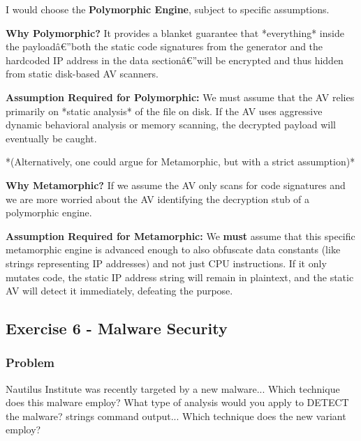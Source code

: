 \documentclass{article}
\begin{document}
I would choose the \textbf{Polymorphic Engine}, subject to specific assumptions.

\textbf{Why Polymorphic?} It provides a blanket guarantee that *everything* inside the payloadâ€”both the static code signatures from the generator and the hardcoded IP address in the data sectionâ€”will be encrypted and thus hidden from static disk-based AV scanners.

\textbf{Assumption Required for Polymorphic:} We must assume that the AV relies primarily on *static analysis* of the file on disk. If the AV uses aggressive dynamic behavioral analysis or memory scanning, the decrypted payload will eventually be caught.

*(Alternatively, one could argue for Metamorphic, but with a strict assumption)*

\textbf{Why Metamorphic?} If we assume the AV only scans for code signatures and we are more worried about the AV identifying the decryption stub of a polymorphic engine.

\textbf{Assumption Required for Metamorphic:} We \textbf{must} assume that this specific metamorphic engine is advanced enough to also obfuscate data constants (like strings representing IP addresses) and not just CPU instructions. If it only mutates code, the static IP address string will remain in plaintext, and the static AV will detect it immediately, defeating the purpose.

\subsection{Exercise 6 - Malware Security}
\subsubsection*{Problem}
Nautilus Institute was recently targeted by a new malware... Which technique does this malware employ? What type of analysis would you apply to DETECT the malware? strings command output... Which technique does the new variant employ?
\end{document}
